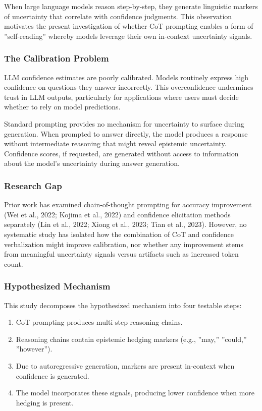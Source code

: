 
When large language models reason step-by-step, they generate linguistic markers of uncertainty that correlate with confidence judgments. This observation motivates the present investigation of whether CoT prompting enables a form of ''self-reading'' whereby models leverage their own in-context uncertainty signals.

\subsubsection{The Calibration Problem}

LLM confidence estimates are poorly calibrated. Models routinely express high confidence on questions they answer incorrectly. This overconfidence undermines trust in LLM outputs, particularly for applications where users must decide whether to rely on model predictions.

Standard prompting provides no mechanism for uncertainty to surface during generation. When prompted to answer directly, the model produces a response without intermediate reasoning that might reveal epistemic uncertainty. Confidence scores, if requested, are generated without access to information about the model's uncertainty during answer generation.

\subsubsection{Research Gap}

Prior work has examined chain-of-thought prompting for accuracy improvement (Wei et al., 2022; Kojima et al., 2022) and confidence elicitation methods separately (Lin et al., 2022; Xiong et al., 2023; Tian et al., 2023). However, no systematic study has isolated how the combination of CoT and confidence verbalization might improve calibration, nor whether any improvement stems from meaningful uncertainty signals versus artifacts such as increased token count.

\subsubsection{Hypothesized Mechanism}

This study decomposes the hypothesized mechanism into four testable steps:

\begin{enumerate}
\item CoT prompting produces multi-step reasoning chains.
\item Reasoning chains contain epistemic hedging markers (e.g., ''may,'' ''could,'' ''however'').
\item Due to autoregressive generation, markers are present in-context when confidence is generated.
\item The model incorporates these signals, producing lower confidence when more hedging is present.
\end{enumerate}

